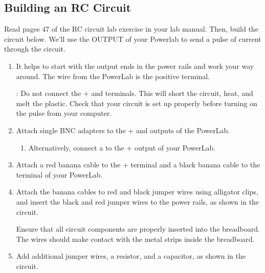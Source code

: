 \documentclass[letterpaper,10pt,english]{jupyterBook}
\begin{document}
\subsection{Building an RC Circuit}
\label{\detokenize{ModelingNeuralMembranes:building-an-rc-circuit}}
\sphinxAtStartPar
Read pages 4\sphinxhyphen{}7 of the RC circuit lab exercise in your lab manual. Then, build the circuit below. We’ll use the OUTPUT of your Powerlab to send a pulse of current through the circuit.
\begin{enumerate}
%
\item {} 
\sphinxAtStartPar
It helps to start with the output ends in the power rails and work your way around. The  wire from the PowerLab is the positive terminal.

\sphinxAtStartPar
{}: Do not connect the + and \sphinxhyphen{} terminals. This will short the circuit, heat, and melt the plastic. Check that your circuit is set up properly before turning on the pulse from your computer.

\item {} 
\sphinxAtStartPar
Attach single BNC adapters to the + and \sphinxhyphen{} outputs of the PowerLab.
\begin{enumerate}
%
\item {} 
\sphinxAtStartPar
Alternatively, connect a  to the + output of your PowerLab.

\end{enumerate}

\item {} 
\sphinxAtStartPar
Attach a red banana cable to the + terminal and a black banana cable to the \sphinxhyphen{} terminal of your PowerLab.

\item {} 
\sphinxAtStartPar
Attach the banana cables to red and black jumper wires using alligator clips, and insert the black and red jumper wires to the power rails, as shown in the circuit.

\sphinxAtStartPar
{} Ensure that all circuit components are properly inserted into the breadboard. The wires should make contact with the metal strips inside the breadboard.

\item {} 
\sphinxAtStartPar
Add additional jumper wires, a resistor, and a capacitor, as shown in the circuit.


\end{enumerate}
\end{document}
